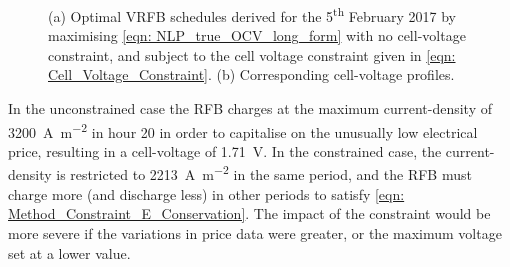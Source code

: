 \documentclass[preprint,3p,review,authoryear,10pt]{elsarticle}
\begin{document}
\begin{figure}[!ht]
\centering
{}
\caption{(a) Optimal VRFB schedules derived for the 5\textsuperscript{th} February 2017 by maximising \cref{eqn: NLP_true_OCV_long_form} with no cell-voltage constraint, and subject to the cell voltage constraint given in \cref{eqn: Cell_Voltage_Constraint}. (b) Corresponding cell-voltage profiles.}
\end{figure}

In the unconstrained case the RFB charges at the maximum current-density of \SI{3200}{\ampere\per\square\meter} in hour 20 in order to capitalise on the unusually low electrical price, resulting in a cell-voltage of \SI{1.71}{\volt}. In the constrained case, the current-density is restricted to \SI{2213}{\ampere\per\square\meter} in the same period, and the RFB must charge more (and discharge less) in other periods to satisfy \cref{eqn: Method_Constraint_E_Conservation}. The impact of the constraint would be more severe if the variations in price data were greater, or the maximum voltage set at a lower value.
\end{document}

